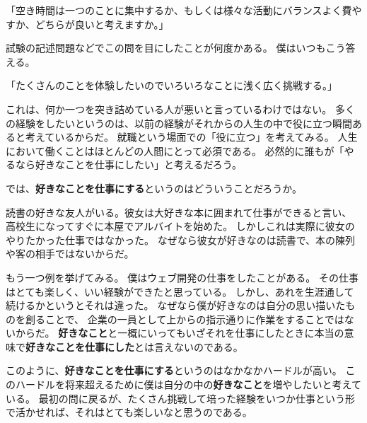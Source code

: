 \documentclass[]{tarticle}
\begin{document}
「空き時間は一つのことに集中するか、もしくは様々な活動にバランスよく費やすか、どちらが良いと考えますか。」

試験の記述問題などでこの問を目にしたことが何度かある。
僕はいつもこう答える。

「たくさんのことを体験したいのでいろいろなことに浅く広く挑戦する。」

これは、何か一つを突き詰めている人が悪いと言っているわけではない。
多くの経験をしたいというのは、以前の経験がそれからの人生の中で役に立つ瞬間あると考えているからだ。
就職という場面での「役に立つ」を考えてみる。
人生において働くことはほとんどの人間にとって必須である。
必然的に誰もが「やるなら好きなことを仕事にしたい」と考えるだろう。

では、{\bf 好きなことを仕事にする}というのはどういうことだろうか。

読書の好きな友人がいる。彼女は大好きな本に囲まれて仕事ができると言い、
高校生になってすぐに本屋でアルバイトを始めた。
しかしこれは実際に彼女のやりたかった仕事ではなかった。
なぜなら彼女が好きなのは読書で、本の陳列や客の相手ではないからだ。

もう一つ例を挙げてみる。
僕はウェブ開発の仕事をしたことがある。
その仕事はとても楽しく、いい経験ができたと思っている。
しかし、あれを生涯通して続けるかというとそれは違った。
なぜなら僕が好きなのは自分の思い描いたものを創ることで、
企業の一員として上からの指示通りに作業をすることではないからだ。
{\bf 好きなこと}と一概にいってもいざそれを仕事にしたときに本当の意味で{\bf 好きなことを仕事にした}とは言えないのである。

このように、{\bf 好きなことを仕事にする}というのはなかなかハードルが高い。
このハードルを将来超えるために僕は自分の中の{\bf 好きなこと}を増やしたいと考えている。
最初の問に戻るが、たくさん挑戦して培った経験をいつか仕事という形で活かせれば、それはとても楽しいなと思うのである。
\end{document}

